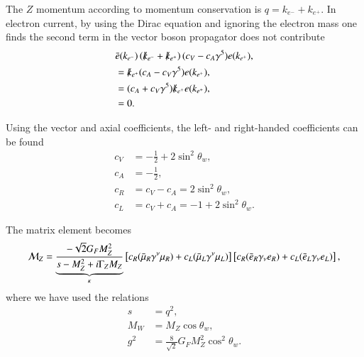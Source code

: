 The $Z$ momentum according to momentum conservation is $q = k_{e^-} + k_{e^+}$. In electron current, by using the Dirac equation and ignoring the electron mass one finds the second term in the vector boson propagator does not contribute
\begin{align*}
     &\bar{e} (k_{e^-}) \left( \slashed{k}_{e^-} + \slashed{k}_{e^+} \right) (c_V - c_A \gamma^5) e(k_{e^+}), \\
     &= \slashed{k}_{e^+} (c_A - c_V \gamma^5) e(k_{e^+}), \\
     &= (c_A + c_V \gamma^5) \slashed{k}_{e^+} e(k_{e^+}),  \\
     &=0.
\end{align*}

Using the vector and axial coefficients, the left- and right-handed coefficients can be found
\begin{align}
   c_V &= -\frac{1}{2} + 2 \sin^2 \theta_w, \\
   c_A &= -\frac{1}{2},  \\
   c_R &= c_V - c_A = 2\sin^2 \theta_w, \\
   c_L &= c_V + c_A = -1 + 2 \sin^2 \theta_w.
\end{align}

The matrix element becomes
\begin{align*}
   \mathcal{M}_Z = \underbrace{\frac{-\sqrt{2} G_F M_Z^2}{s - M^2_Z + i\Gamma_Z M_Z}}_{\kappa} \left[ c_R (\bar{\mu}_R \gamma^\nu \mu_R) + c_L (\bar{\mu}_L \gamma^\nu \mu_L) \right] \left[ c_R (\bar{e}_R \gamma_\nu e_R ) + c_L (\bar{e}_L \gamma_\nu e_L) \right],
\end{align*}
where we have used the relations
\begin{align*}
   s &= q^2, \\
   M_W &= M_Z \cos \theta_w, \\
   g^2 &= \frac{8}{\sqrt{2}} G_F M_Z^2 \cos^2 \theta_w.
\end{align*}

